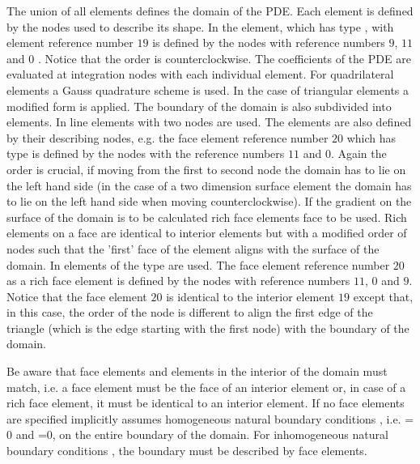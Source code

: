 The union of all elements defines the domain of the PDE.
Each element is defined by the nodes used to describe its shape. In  the element,
which has type ,
with element reference number $19$  is defined by the nodes
with reference numbers $9$, $11$ and $0$ . Notice that the order is counterclockwise. 
The coefficients of the PDE are evaluated at integration nodes with each individual element. 
For quadrilateral elements a Gauss quadrature scheme is used. In the case of triangular elements a 
modified form is applied. The boundary of the domain is also subdivided into elements.  In 
line elements with two nodes are used. The elements are also defined by their describing nodes, e.g.
the face element reference number $20$ which has type  is defined by the nodes
with the reference numbers $11$ and $0$. Again the order is crucial, if moving from the first
to second node the domain has to lie on the left hand side (in the case of a two dimension surface element
the domain has to lie on the left hand side when moving counterclockwise). If the gradient on the
surface of the domain is to be calculated rich face elements face to be used. Rich elements on a face
are identical to interior elements but with a modified order of nodes such that the 'first' face of the element aligns
with the surface of the domain. In 
elements of the type  are used. 
The face element reference number $20$ as a rich face element is defined by the nodes
with reference numbers $11$, $0$ and $9$. Notice that the face element $20$ is identical to the
interior element $19$ except that, in this case, the order of the node is different to align the first
edge of the triangle (which is the edge starting with the first node) with the boundary of the domain.

Be aware that face elements and elements in the interior of the domain must match, i.e. a face element must be the face
of an interior element or, in case of a rich face element, it must be identical to an interior element.
If no face elements are specified
\finley implicitly assumes homogeneous natural boundary conditions ,
i.e. =$0$ and =$0$, on the entire boundary of the domain. For  
inhomogeneous natural boundary conditions , 
the boundary must be described by face elements. 

